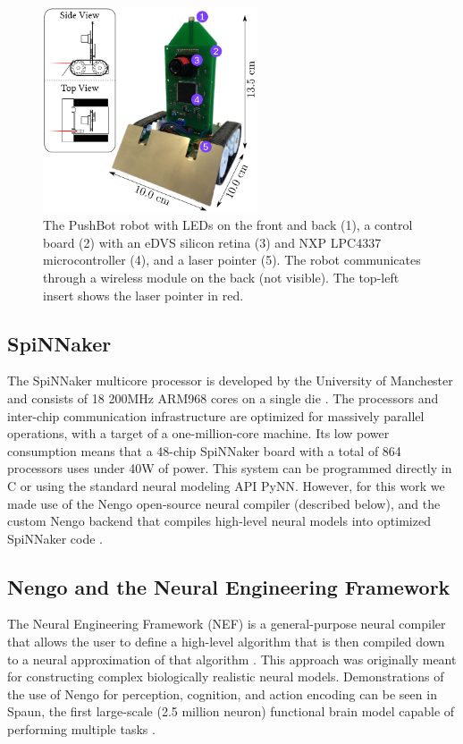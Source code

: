 \documentclass[conference]{IEEEtran}
\begin{document}
\begin{figure}[!t]
\centering
\includegraphics[width=2.5in]{Pushbot.png}
\caption{The PushBot robot with LEDs on the front and back (1), a control
board (2) with an eDVS silicon retina (3) and NXP LPC4337 microcontroller (4),
and a laser pointer (5).  The robot communicates through a wireless module on
the back (not visible).  The top-left insert shows the laser pointer in red.}
\label{fig_sim}
\end{figure}


\subsection{SpiNNaker}

The SpiNNaker multicore processor is developed by the University of Manchester 
and consists of 18 200MHz ARM968 cores on a single die \cite{furber2007neural, furber2014spinnaker}. 
The processors and inter-chip communication infrastructure are optimized for
massively parallel operations, with a target of a one-million-core machine.  Its
low power consumption means that a 48-chip SpiNNaker board with a total of 
864 processors uses under 40W of power. This system can be programmed directly 
in C or using the standard neural modeling API PyNN. However, for this work
we made use of the Nengo open-source neural compiler \cite{bekolay_nengo2014} 
(described below), and the custom Nengo backend that compiles high-level
neural models into optimized SpiNNaker code \cite{mundy2015}.

\subsection{Nengo and the Neural Engineering Framework}

The Neural Engineering Framework (NEF) is a general-purpose neural compiler 
that allows the user to define a high-level algorithm that is then compiled 
down to a neural approximation of that algorithm \cite{eliasmith2004neural}. 
This approach was originally meant for constructing complex biologically realistic neural 
models. Demonstrations of the use of Nengo for perception, cognition, and 
action encoding can be seen in Spaun, the first large-scale 
(2.5 million neuron) functional brain model capable of performing multiple 
tasks  \cite{eliasmith_largescale_2012}. 
\end{document}
